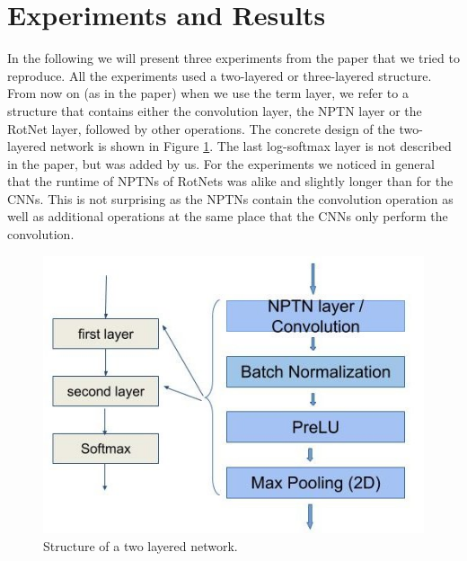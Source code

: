 \documentclass{llncs}
\begin{document}

\section{Experiments and Results}	
In the following we will present three experiments from the paper that we tried to reproduce. 
All the experiments used a two-layered or three-layered structure. From now on (as in the paper) when we use the term layer, we refer to a structure that contains either the convolution layer, the NPTN layer or the RotNet layer, followed by other operations. The concrete design of the two-layered network is shown in Figure \ref{pic:network_structure}. The last log-softmax layer is not described in the paper, but was added by us. 
For the experiments we noticed in general that the runtime of NPTNs of RotNets was alike and slightly longer than for the CNNs. This is not surprising as the NPTNs contain the convolution operation as well as additional operations at the same place that the CNNs only perform the convolution. 

\begin{figure}
	\begin{center}
	\includegraphics[scale=0.35]{result_images/network_structure.jpg}
	\caption{Structure of a two layered network.}
	\label{pic:network_structure}
	\end{center}
\end{figure}
\end{document}
